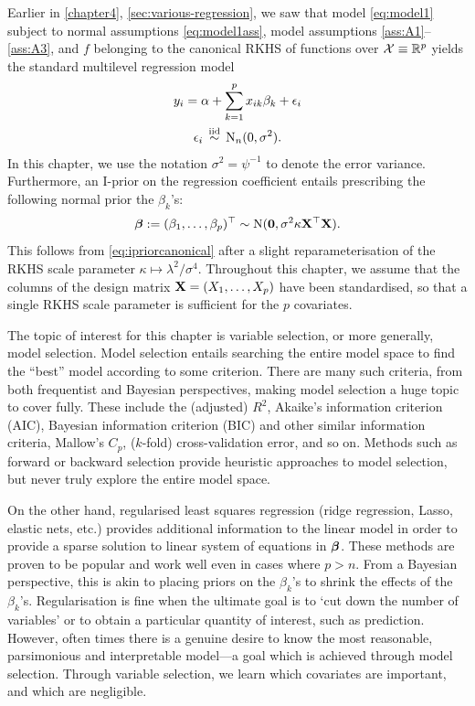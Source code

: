 \documentclass[a4paper,showframe,11pt]{report}
\begin{document}
\label{chapter6}

Earlier in \cref{chapter4}, \cref{sec:various-regression}, we saw that model \cref{eq:model1} subject to normal assumptions \cref{eq:model1ass}, model assumptions \ref{ass:A1}--\ref{ass:A3}, and $f$ belonging to the canonical RKHS of functions over ${\mathcal X} \equiv \mathbb{R}^p$ yields the standard multilevel regression model
\begin{align}\label{eq:linmod}
  \begin{gathered}
    y_i = \alpha + \sum_{k=1}^p x_{ik}\beta_k + \epsilon_i \\
    \epsilon_i \,\overset{\text{iid}}{\sim}\, \operatorname{N}_n(0, \sigma^2).
  \end{gathered}  
\end{align}
In this chapter, we use the notation $\sigma^2 = \psi^{-1}$ to denote the error variance.
Furthermore, an I-prior on the regression coefficient entails prescribing the following normal prior the $\beta_k$'s:
\[
  {\bm\beta} := (\beta_1,\dots,\beta_p)^\top \sim \operatorname{N} ({\mathbf 0}, \sigma^2 \kappa \mathbf X^\top \mathbf X).
\]
This follows from \cref{eq:ipriorcanonical} after a slight reparameterisation of the RKHS scale parameter $\kappa \mapsto \lambda^2/\sigma^4$. 
Throughout this chapter, we assume that the columns of the design matrix ${\mathbf X} = (X_1,\dots,X_p)$ have been standardised, so that a single RKHS scale parameter is sufficient for the $p$ covariates.

The topic of interest for this chapter is variable selection, or more generally, model selection.
Model selection entails searching the entire model space to find the ``best'' model according to some criterion. 
There are many such criteria, from both frequentist and Bayesian perspectives, making model selection a huge topic to cover fully. 
These include the (adjusted) $R^2$, Akaike's information criterion (AIC), Bayesian information criterion (BIC) and other similar information criteria, Mallow's $C_p$, ($k$-fold) cross-validation error, and so on. 
Methods such as forward or backward selection provide heuristic approaches to model selection, but never truly explore the entire model space.

On the other hand, regularised least squares regression (ridge regression, Lasso, elastic nets, etc.) provides additional information to the linear model in order to provide a sparse solution to linear system of equations in ${\bm\beta}$.
These methods are proven to be popular and work well even in cases where $p > n$.
From a Bayesian perspective, this is akin to placing priors on the $\beta_k$'s to shrink the effects of the $\beta_k$'s.
Regularisation is fine when the ultimate goal is to `cut down the number of variables' or to obtain a particular quantity of interest, such as prediction.
However, often times there is a genuine desire to know the most reasonable, parsimonious and interpretable model---a goal which is achieved through model selection.
Through variable selection, we learn which covariates are important, and which are negligible.
\end{document}
